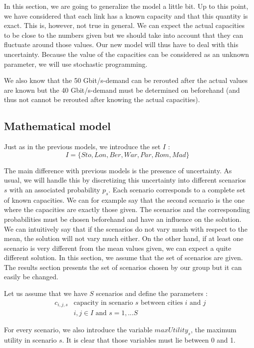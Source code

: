 In this section, we are going to generalize the model a little bit. Up to this point, we have considered that each link has a known capacity and that this quantity is exact. This is, however, not true in general. We can expect the actual capacities to be close to the numbers given but we should take into account that they can fluctuate around those values. Our new model will thus have to deal with this uncertainty. Because the value of the capacities can be considered as an unknown parameter, we will use stochastic programming.

We also know that the 50 Gbit/s-demand can be rerouted after the actual values are known but the 40 Gbit/s-demand must be determined on beforehand (and thus not cannot be rerouted after knowing the actual capacities).

\subsection{Mathematical model}
Just as in the previous models, we introduce the set $I$ :
$$I = \{ Sto,Lon,Ber,War,Par,Rom,Mad\}$$

The main difference with previous models is the presence of uncertainty. As usual, we will handle this by discretizing this uncertainty into different scenarios $s$ with an associated probability $p_s$. Each scenario corresponds to a complete set of known capacities. We can for example say that the second scenario is the one where the capacities are exactly those given. The scenarios and the corresponding probabilities must be chosen beforehand and have an influence on the solution. We can intuitively say that if the scenarios do not vary much with respect to the mean, the solution will not vary much either. On the other hand, if at least one scenario is very different from the mean values given, we can expect a quite different solution. In this section, we assume that the set of scenarios are given. The results section presents the set of scenarios chosen by our group but it can easily be changed.

Let us assume that we have $S$ scenarios and define the parameters : 
\begin{align*}
&c_{i,j,s} &\text{capacity in scenario $s$ between cities $i$ and $j$} \\
& &i,j \in I \text{ and } s=1,...S
\end{align*}

For every scenario, we also introduce the variable $maxUtility_s$, the maximum utility in scenario $s$. It is clear that those variables must lie between 0 and 1.

